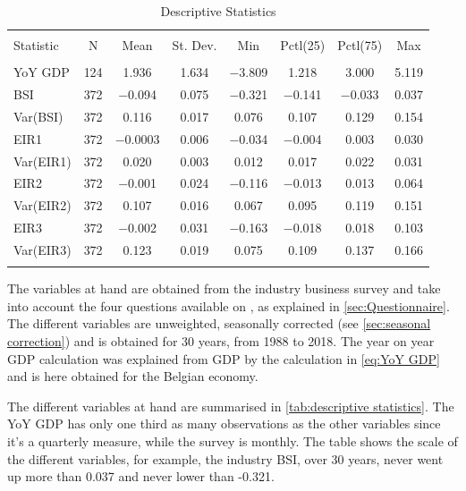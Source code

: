 \documentclass[12pt,a4paper,oneside]{book}
\begin{document}
\begin{table}[!htbp]  \centering \footnotesize 
  \caption{Descriptive Statistics} 
  \label{tab:descriptive statistics} 
\begin{tabular}{@{\extracolsep{5pt}}lccccccc} 
\\[-1.8ex]\hline 
\hline \\[-1.8ex] 
Statistic & \multicolumn{1}{c}{N} & \multicolumn{1}{c}{Mean} & \multicolumn{1}{c}{St. Dev.} & \multicolumn{1}{c}{Min} & \multicolumn{1}{c}{Pctl(25)} & \multicolumn{1}{c}{Pctl(75)} & \multicolumn{1}{c}{Max} \\ 
\hline \\[-1.8ex] 
YoY GDP     & 124       & 1.936 & 1.634 & $-$3.809 & 1.218 & 3.000 & 5.119 \\ 
BSI         & 372       & $-$0.094 & 0.075 & $-$0.321 & $-$0.141 & $-$0.033 & 0.037 \\ 
Var(BSI)    & 372       & 0.116 & 0.017 & 0.076 & 0.107 & 0.129 & 0.154 \\ 
EIR1        & 372       & $-$0.0003 & 0.006 & $-$0.034 & $-$0.004 & 0.003 & 0.030 \\ 
Var(EIR1)   & 372       & 0.020 & 0.003 & 0.012 & 0.017 & 0.022 & 0.031 \\ 
EIR2        & 372       & $-$0.001  & 0.024 & $-$0.116 & $-$0.013 & 0.013 & 0.064 \\ 
Var(EIR2)   & 372       & 0.107 & 0.016 & 0.067 & 0.095 & 0.119 & 0.151 \\ 
EIR3        & 372  & $-$0.002  & 0.031 & $-$0.163 & $-$0.018 & 0.018 & 0.103 \\ 
Var(EIR3)   & 372       & 0.123 & 0.019 & 0.075 & 0.109 & 0.137 & 0.166 \\ 
\hline \\[-1.8ex] 
\end{tabular} 
\end{table} 

The variables at hand are obtained from the industry business survey and take into account the four questions available on , as explained in \autoref{sec:Questionnaire}.
The different variables are unweighted, seasonally corrected (see \autoref{sec:seasonal correction}) and is obtained for 30 years, from 1988 to 2018.
The year on year GDP calculation was explained from GDP by the calculation in \autoref{eq:YoY GDP} and is here obtained for the Belgian economy.

The different variables at hand are summarised in \autoref{tab:descriptive statistics}. The YoY GDP has only one third as many observations as the other variables since it's a quarterly measure, while the survey is monthly. 
The table shows the scale of the different variables, for example, the industry BSI, over 30 years, never went up more than 0.037 and never lower than -0.321.
\end{document}
